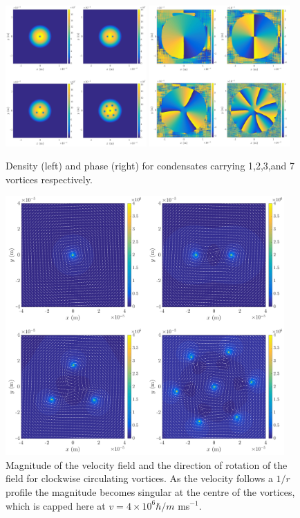 \begin{figure}\centering
    \includegraphics[width=0.48\textwidth]{Images/ch4_vtx/fewvortex_rho.pdf}
    \includegraphics[width=0.48\textwidth]{Images/ch4_vtx/fewvortex_theta.pdf}
    \caption{Density (left) and phase (right) for condensates carrying 1,2,3,and 7 vortices respectively.}
    \label{fig:few_rho}
\end{figure}

\begin{figure}\centering
    \includegraphics[width=0.95\textwidth]{Images/ch4_vtx/velocity.pdf}
    \caption{Magnitude of the velocity field and the direction of rotation of the field for clockwise circulating vortices. As the velocity follows a $1/r$ profile the magnitude becomes singular at the centre of the vortices, which is capped here at $v=4\times 10^{6} \hbar/m$ ms$^{-1}$.}
    \label{fig:vel_field}
\end{figure}

